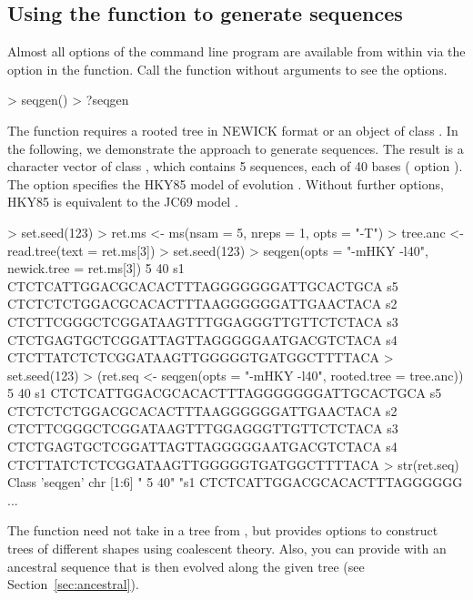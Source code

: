 \subsection[Using the seqgen() function to generate sequences]{Using the  function to generate sequences}
\label{sec:seqgen}

Almost all options of the command line program  are available from within  via
the option  in the  function.
Call the function without arguments to see the options.
\begin{Code}
> seqgen()
> ?seqgen
\end{Code}

The  function requires a rooted tree in NEWICK format or an object of class .
In the following, we demonstrate the  approach
to generate sequences. The result is a character
vector of class {\color{red} }, which contains 5 sequences, 
each of 40 bases ( option ). The option  specifies the HKY85
model of evolution \citep{Hasegawa1985}.
Without further options, HKY85 is equivalent to the JC69 model \citep{Jukes1969}.
\begin{Code}
> set.seed(123)
> ret.ms <- ms(nsam = 5, nreps = 1, opts = "-T")
> tree.anc <- read.tree(text = ret.ms[3])
> set.seed(123)
> seqgen(opts = "-mHKY -l40", newick.tree = ret.ms[3])
 5 40
s1        CTCTCATTGGACGCACACTTTAGGGGGGGATTGCACTGCA
s5        CTCTCTCTGGACGCACACTTTAAGGGGGGATTGAACTACA
s2        CTCTTCGGGCTCGGATAAGTTTGGAGGGTTGTTCTCTACA
s3        CTCTGAGTGCTCGGATTAGTTAGGGGGAATGACGTCTACA
s4        CTCTTATCTCTCGGATAAGTTGGGGGTGATGGCTTTTACA
> set.seed(123)
> (ret.seq <- seqgen(opts = "-mHKY -l40", rooted.tree = tree.anc))
 5 40
s1        CTCTCATTGGACGCACACTTTAGGGGGGGATTGCACTGCA
s5        CTCTCTCTGGACGCACACTTTAAGGGGGGATTGAACTACA
s2        CTCTTCGGGCTCGGATAAGTTTGGAGGGTTGTTCTCTACA
s3        CTCTGAGTGCTCGGATTAGTTAGGGGGAATGACGTCTACA
s4        CTCTTATCTCTCGGATAAGTTGGGGGTGATGGCTTTTACA
> str(ret.seq)
Class 'seqgen'  chr [1:6] " 5 40" "s1        CTCTCATTGGACGCACACTTTAGGGGGG ...
\end{Code}

The  function need not take in a tree from ,
but  provides options to construct trees of
different shapes using coalescent theory.
Also, you can provide  with an ancestral sequence that is then evolved along the given tree (see Section~\ref{sec:ancestral}).




